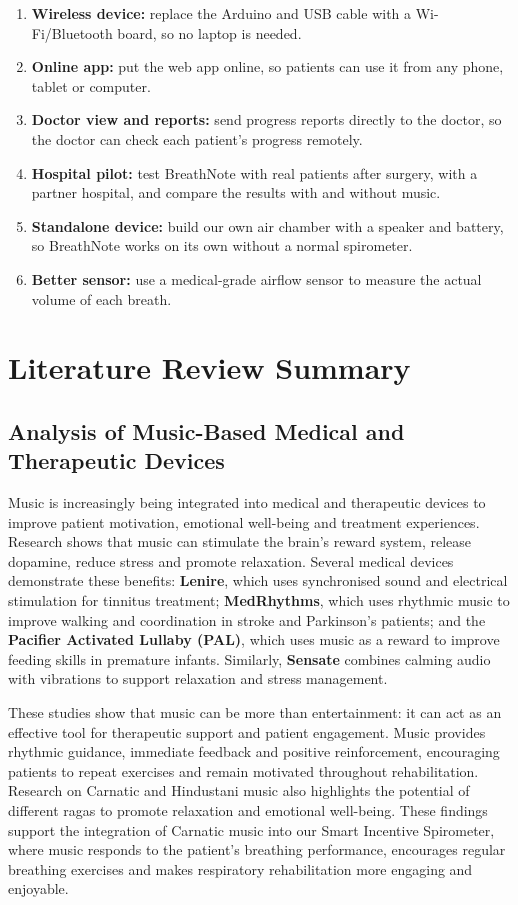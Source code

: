 \documentclass[12pt,a4paper]{article}
\begin{document}
\begin{enumerate}
  \item \textbf{Wireless device:} replace the Arduino and USB cable with a Wi-Fi/Bluetooth board, so no laptop is needed.
  \item \textbf{Online app:} put the web app online, so patients can use it from any phone, tablet or computer.
  \item \textbf{Doctor view and reports:} send progress reports directly to the doctor, so the doctor can check each patient's progress remotely.
  \item \textbf{Hospital pilot:} test BreathNote with real patients after surgery, with a partner hospital, and compare the results with and without music.
  \item \textbf{Standalone device:} build our own air chamber with a speaker and battery, so BreathNote works on its own without a normal spirometer.
  \item \textbf{Better sensor:} use a medical-grade airflow sensor to measure the actual volume of each breath.
\end{enumerate}

\section{Literature Review Summary}
\label{sec:litreview}

\subsection{Analysis of Music-Based Medical and Therapeutic Devices}
Music is increasingly being integrated into medical and therapeutic devices to improve patient motivation, emotional well-being and treatment experiences. Research shows that music can stimulate the brain's reward system, release dopamine, reduce stress and promote relaxation. Several medical devices demonstrate these benefits: \textbf{Lenire}, which uses synchronised sound and electrical stimulation for tinnitus treatment; \textbf{MedRhythms}, which uses rhythmic music to improve walking and coordination in stroke and Parkinson's patients; and the \textbf{Pacifier Activated Lullaby (PAL)}, which uses music as a reward to improve feeding skills in premature infants. Similarly, \textbf{Sensate} combines calming audio with vibrations to support relaxation and stress management.

These studies show that music can be more than entertainment: it can act as an effective tool for therapeutic support and patient engagement. Music provides rhythmic guidance, immediate feedback and positive reinforcement, encouraging patients to repeat exercises and remain motivated throughout rehabilitation. Research on Carnatic and Hindustani music also highlights the potential of different ragas to promote relaxation and emotional well-being. These findings support the integration of Carnatic music into our Smart Incentive Spirometer, where music responds to the patient's breathing performance, encourages regular breathing exercises and makes respiratory rehabilitation more engaging and enjoyable.
\end{document}
